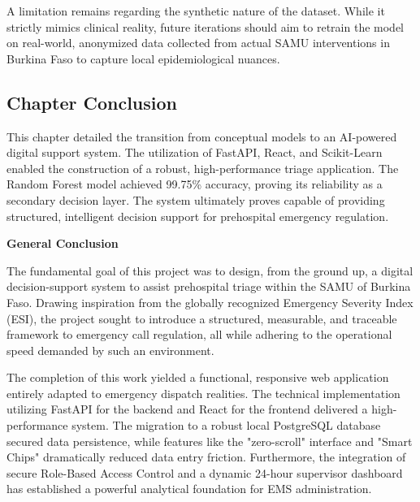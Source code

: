 \documentclass[a4paper,12pt,oneside]{report}
\begin{document}
A limitation remains regarding the synthetic nature of the dataset. While it strictly mimics clinical reality, future iterations should aim to retrain the model on real-world, anonymized data collected from actual SAMU interventions in Burkina Faso to capture local epidemiological nuances.

\subsection*{Chapter Conclusion}
This chapter detailed the transition from conceptual models to an AI-powered digital support system. The utilization of FastAPI, React, and Scikit-Learn enabled the construction of a robust, high-performance triage application. The Random Forest model achieved 99.75\% accuracy, proving its reliability as a secondary decision layer. The system ultimately proves capable of providing structured, intelligent decision support for prehospital emergency regulation.

\clearpage

\newpage
\thispagestyle{fancy}
{\LARGE \bfseries \noindent General Conclusion}
\vspace{2em}
\justifying

The fundamental goal of this project was to design, from the ground up, a digital decision-support system to assist prehospital triage within the SAMU of Burkina Faso. Drawing inspiration from the globally recognized Emergency Severity Index (ESI), the project sought to introduce a structured, measurable, and traceable framework to emergency call regulation, all while adhering to the operational speed demanded by such an environment.

The completion of this work yielded a functional, responsive web application entirely adapted to emergency dispatch realities. The technical implementation utilizing FastAPI for the backend and React for the frontend delivered a high-performance system. The migration to a robust local PostgreSQL database secured data persistence, while features like the "zero-scroll" interface and "Smart Chips" dramatically reduced data entry friction. Furthermore, the integration of secure Role-Based Access Control and a dynamic 24-hour supervisor dashboard has established a powerful analytical foundation for EMS administration.
\end{document}
